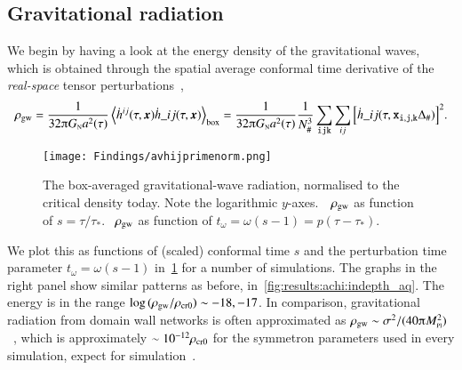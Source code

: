 \subsection{Gravitational radiation}\label{sec:results:h11:rho_gw}
    We begin by having a look at the energy density of the gravitational waves, which is obtained through the spatial average conformal time derivative of the \emph{real-space} tensor perturbations~\citep{kawasakiStudyGravitationalRadiation2011},
    \begin{equation}\label{eq:results:h11:rho_gw}
        \rho\ped{gw} = \frac{1}{32\ppi G\nped{N}a^2(\tau)} \left\langle \dot{h}\^{ij}(\tau, \vec{x})\dot{h}\_{ij}(\tau, \vec{x}) \right\rangle_{\mathrm{box}} =  \frac{1}{32\ppi G\nped{N}a^2(\tau)} \frac{1}{N_\#^3} \sum_{\lcoord{i}\lcoord{j}\lcoord{k}} \sum_{ij} \bclosed{\dot{h}\_{ij}(\tau,\lcoord{x}_{\lcoord{i}, \lcoord{j}, \lcoord{k}} \Delta_\# )}^2.
    \end{equation}
    \begin{figure}[ht]
        \centering
        \texttt{[image: Findings/avhijprimenorm.png]}
        \caption{The box-averaged gravitational-wave radiation, normalised to the critical density today. Note the logarithmic $y$-axes.~~$\rho_\mathrm{gw}$ as function of $s=\tau/\tau_\ast$. ~$\rho_\mathrm{gw}$ as function of $t_\omega = \omega(s-1)= p(\tau-\tau_\ast)$.}
        \label{fig:results:h11:avhijprimenorm}
    \end{figure}
    We plot this as functions of (scaled) conformal time $s$ and the perturbation time parameter $t_\omega = \omega(s-1)$ in~\cref{fig:results:h11:avhijprimenorm} for a number of simulations. %
    The graphs in the right panel show similar patterns as before, in~\cref{fig:results:achi:indepth_aq}. %
    The energy is in the range $\log{(\rho\ensuremath{_\mathrm{gw}}/\rho\ensuremath{_\mathrm{cr0}})}\sim-18, -17$. In comparison, gravitational radiation from domain wall networks is often approximated as $\rho\ped{gw}\sim \sigma^2 /(40\ppi M\nped{Pl}^2)$~\citep{ramazanovFreezeinDarkMatter2022}, which is approximately $ \sim 10^{-12}\rho_\mathrm{cr0}$ for the symmetron parameters used in every simulation, expect for simulation~.
    
    



